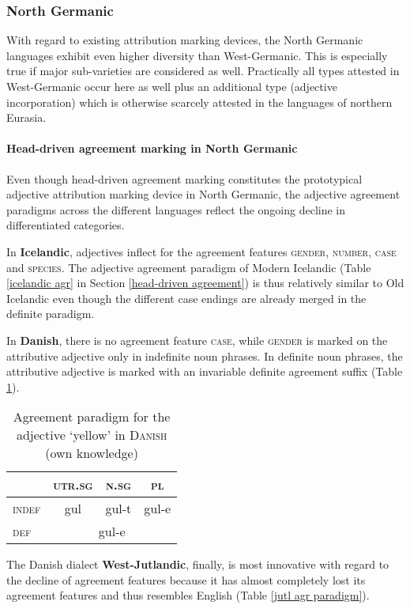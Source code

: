 \subsubsection{North Germanic} \label{n-germanic synchr}
With regard to existing attribution marking devices, the North Germanic languages exhibit even higher diversity than West-Germanic. This is especially true if major sub-varieties are considered as well. Practically all types attested in West-Germanic occur here as well plus an additional type (adjective incorporation) which is otherwise scarcely attested in the languages of northern Eurasia.

\paragraph{Head-driven agreement marking in North Germanic} Even though head-driven agreement marking constitutes the prototypical adjective attribution marking device in North Germanic, the adjective agreement paradigms across the different languages reflect the ongoing decline in differentiated categories.

In {\bf Icelandic}, adjectives inflect for the agreement features \textsc{gender}, \textsc{number}, \textsc{case} and \textsc{species}. The adjective agreement paradigm of Modern Icelandic (Table \ref{icelandic agr} in Section \ref{head-driven agreement}) is thus relatively similar to Old Icelandic even though the different case endings are already merged in the definite paradigm.

In {\bf Danish},\label{danish synchr} there is no agreement feature \textsc{case}, while \textsc{gender} is marked on the attributive adjective only in indefinite noun phrases. In definite noun phrases, the attributive adjective is marked with an invariable definite agreement suffix (Table \ref{danish agr paradigm}). 

\begin{table}
\begin{center}
\begin{footnotesize}
\begin{tabular}[h]{l|c c c}
\hline
\hline
		& \textsc{utr.sg}	&\textsc{n.sg}	&\textsc{pl}\\
\hline
\textsc{indef}	&gul	 	&gul-t		&gul-e\\
\hline
\textsc{def}	&\multicolumn{3}{c}{gul-e}\\
\hline
\hline
\end{tabular}
\caption[Adjective paradigm for \textsc{Danish}]{Agreement paradigm for the adjective ‘yellow’ in \textsc{Danish} (own knowledge)}\label{danish agr paradigm}
\end{footnotesize}
\end{center}
\end{table}
The Danish dialect {\bf West-Jutlandic}, finally, is most innovative with regard to the decline of agreement features because it has almost completely lost its agreement features and thus resembles English (Table \ref{jutl agr paradigm}).

